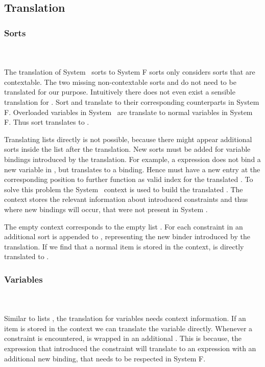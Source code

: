 \subsection{Translation}
\subsubsection{Sorts}\hfill\\\\
The translation of System \Fo\ sorts to System F sorts only considers sorts that are contextable. 
The two missing non-contextable sorts  and  do not need to be translated for our purpose. 
Intuitively there does not even exist a sensible translation for .
\DPTSort
Sort  and  translate to their corresponding counterparts in System F. 
Overloaded variables in System \Fo\ are translate to normal variables in System F. 
Thus sort  translates to . 

\noindent Translating lists  directly is not possible, because there might appear additional sorts inside the list after the translation. 
New sorts must be added for variable bindings introduced by the translation. 
For example, a    \Constr{=}    expression does not bind a new variable in , but translates to a     binding. 
Hence  must have a new entry  at the corresponding position to further function as valid index for the translated . 
To solve this problem the System \Fo\ context  is used to build the translated . 
The context stores the relevant information about introduced constraints and thus where new bindings will occur, that were not present in System \Fo. 

\DPTSorts
The empty context  corresponds to the empty list \Constr{[]}.
For each constraint in  an additional sort  is appended to , representing the new binder introduced by the translation. 
If we find that a normal item is stored in the context,  is directly translated to  .

\subsubsection{Variables}\hfill\\\\
Similar to lists , the translation for variables  needs context information.  
\DPTVar
If an item is stored in the context we can translate the variable directly. 
Whenever a constraint is encountered,  is wrapped in an additional . 
This is because, the expression that introduced the constraint will translate to an expression with an additional new binding, that needs to be respected in System F.

